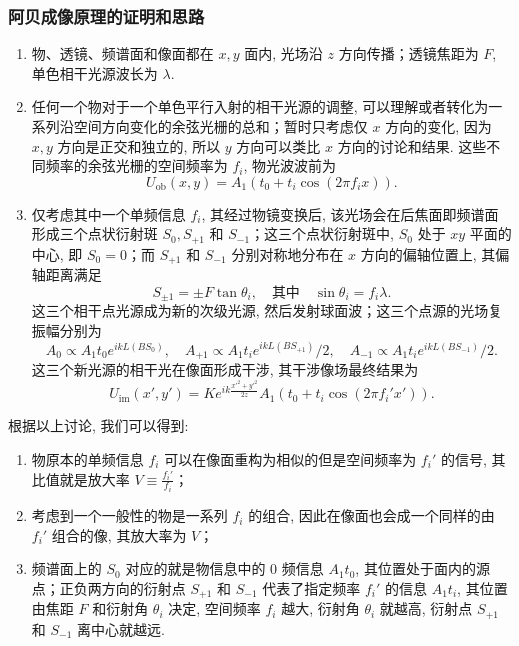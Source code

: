 \documentclass[zihao=5, UTF8]{article}
\theoremstyle{MyLineTheoremStyle} %
\theoremstyle{MyBlockTheoremStyle} %
\theoremstyle{MySubsubsectionStyle} %
\begin{document}
\subsubsection{阿贝成像原理的证明和思路}

\begin{enumerate}
    \item 物、透镜、频谱面和像面都在 \(x, y\) 面内, 光场沿 \(z\) 方向传播；透镜焦距为 \(F\), 单色相干光源波长为 \(\lambda\). 
    \item 任何一个物对于一个单色平行入射的相干光源的调整, 可以理解或者转化为一系列沿空间方向变化的余弦光栅的总和；暂时只考虑仅 \(x\) 方向的变化, 因为 \(x, y\) 方向是正交和独立的, 所以 \(y\) 方向可以类比 \(x\) 方向的讨论和结果. 这些不同频率的余弦光栅的空间频率为 \(f_i\), 物光波波前为
    \[
    U_{\text{ob}}(x, y) = A_1(t_0 + t_i \cos(2\pi f_i x)).
    \]
    \item 仅考虑其中一个单频信息 \(f_i\), 其经过物镜变换后, 该光场会在后焦面即频谱面形成三个点状衍射斑 \(S_0, S_{+1}\) 和 \(S_{-1}\)；这三个点状衍射斑中, \(S_0\) 处于 \(xy\) 平面的中心, 即 \(S_0 = 0\)；而 \(S_{+1}\) 和 \(S_{-1}\) 分别对称地分布在 \(x\) 方向的偏轴位置上, 其偏轴距离满足
    \[
    S_{\pm 1} = \pm F \tan \theta_i, \quad \text{其中} \quad \sin \theta_i = f_i \lambda.
    \]
    这三个相干点光源成为新的次级光源, 然后发射球面波；这三个点源的光场复振幅分别为
    \[
    A_0 \propto A_1 t_0 e^{ik L(B S_0)}, \quad A_{+1} \propto A_1 t_i e^{ik L(B S_{+1})}/2, \quad A_{-1} \propto A_1 t_i e^{ik L(B S_{-1})}/2.
    \]
    这三个新光源的相干光在像面形成干涉, 其干涉像场最终结果为
    \[
    U_{\text{im}}(x', y') = K e^{ik \frac{x'^2 + y'^2}{2z}} A_1(t_0 + t_i \cos(2\pi f_i' x')).
    \]
\end{enumerate}

根据以上讨论, 我们可以得到: 
\begin{enumerate}
    \item 物原本的单频信息 \(f_i\) 可以在像面重构为相似的但是空间频率为 \(f_i'\) 的信号, 其比值就是放大率 \(V \equiv \frac{f_i'}{f_i}\)；
    \item 考虑到一个一般性的物是一系列 \(f_i\) 的组合, 因此在像面也会成一个同样的由 \(f_i'\) 组合的像, 其放大率为 \(V\)；
    \item 频谱面上的 \(S_0\) 对应的就是物信息中的 0 频信息 \(A_1 t_0\), 其位置处于面内的源点；正负两方向的衍射点 \(S_{+1}\) 和 \(S_{-1}\) 代表了指定频率 \(f_i'\) 的信息 \(A_1 t_i\), 其位置由焦距 \(F\) 和衍射角 \(\theta_i\) 决定, 空间频率 \(f_i\) 越大, 衍射角 \(\theta_i\) 就越高, 衍射点 \(S_{+1}\) 和 \(S_{-1}\) 离中心就越远. 
\end{enumerate}
\end{document}
